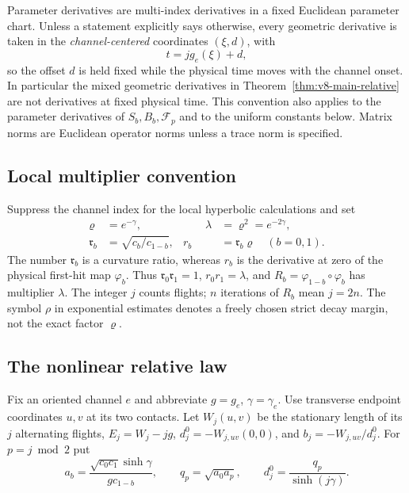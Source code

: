 Parameter derivatives are multi-index derivatives in a fixed Euclidean
parameter chart.  Unless a statement explicitly says otherwise, every
geometric derivative is taken in the \emph{channel-centered} coordinates
$(\xi,d)$, with
\begin{equation}\label{eq:v19-centered-coordinate-convention}
                         t=jg_e(\xi)+d,
\end{equation}
so the offset $d$ is held fixed while the physical time moves with the
channel onset.  In particular the mixed geometric derivatives in
Theorem~\ref{thm:v8-main-relative} are not derivatives at fixed physical
time.  This convention also applies to the parameter derivatives of
$S_b,B_b,\mathcal F_p$ and to the uniform constants below. Matrix norms are
Euclidean operator norms unless a trace norm is specified.

\subsection{Local multiplier convention}
\label{sec:v15-notation}
Suppress the channel index for the local hyperbolic calculations and set
\begin{equation}\label{eq:v15-multiplier-convention}
 \begin{aligned}
 \varrho&=e^{-\gamma},&\qquad \lambda&=\varrho^2=e^{-2\gamma},\\
 \mathfrak r_b&=\sqrt{c_b/c_{1-b}},&
 r_b&=\mathfrak r_b\varrho\quad(b=0,1).
 \end{aligned}
\end{equation}
The number $\mathfrak r_b$ is a curvature ratio, whereas $r_b$ is the
derivative at zero of the physical first-hit map $\varphi_b$. Thus
$\mathfrak r_0\mathfrak r_1=1$, $r_0r_1=\lambda$, and
$R_b=\varphi_{1-b}\circ\varphi_b$ has multiplier $\lambda$. The integer
$j$ counts flights; $n$ iterations of $R_b$ mean $j=2n$. The symbol
$\rho$ in exponential estimates denotes a freely chosen strict decay
margin, not the exact factor $\varrho$.

\subsection{The nonlinear relative law}
Fix an oriented channel $e$ and abbreviate $g=g_e$, $\gamma=\gamma_e$.
Use transverse endpoint coordinates $u,v$ at its two contacts. Let
$W_j(u,v)$ be the stationary length of its $j$ alternating flights,
$E_j=W_j-jg$, $d_j^0=-W_{j,uv}(0,0)$, and $b_j=-W_{j,uv}/d_j^0$.
For $p=j\bmod2$ put
\[
 a_b=\frac{\sqrt{c_0c_1}\sinh\gamma}{g c_{1-b}},\qquad
 q_p=\sqrt{a_0a_p},\qquad
 d_j^0=\frac{q_p}{\sinh(j\gamma)}.
\]

